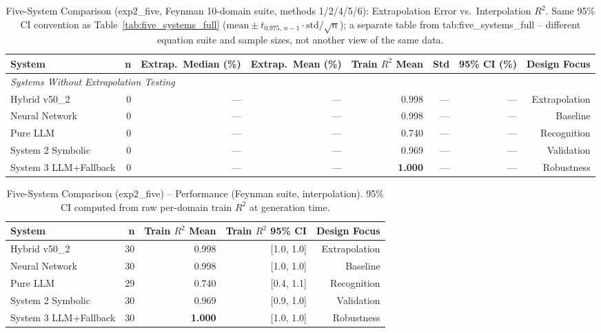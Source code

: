 \documentclass[twoside,11pt]{article}
\begin{document}
\begin{table}[t]
\centering
\caption{Five-System Comparison (exp2\_five, Feynman 10-domain suite,
  methods 1/2/4/5/6): Extrapolation Error vs.\ Interpolation $R^2$.
  Same 95\% CI convention as Table~\ref{tab:five_systems_full}
  ($\mathrm{mean} \pm t_{0.975,\,n-1} \cdot \mathrm{std}/\sqrt{n}$); a
  separate table from tab:five\_systems\_full -- different equation suite
  and sample sizes, not another view of the same data.}
\label{tab:five_systems_full_exp2five}
\begin{tabular}{lrrrrrrr}
\toprule
\textbf{System} & \textbf{n}
  & \textbf{Extrap.\ Median (\%)} & \textbf{Extrap.\ Mean (\%)}
  & \textbf{Train $R^2$ Mean} & \textbf{Std} & \textbf{95\% CI (\%)}
  & \textbf{Design Focus} \\
\midrule
\midrule
\multicolumn{8}{l}{\textit{Systems Without Extrapolation Testing}} \\
Hybrid v50\_2 & 0 & --- & --- & 0.998 & --- & --- & Extrapolation \\
Neural Network & 0 & --- & --- & 0.998 & --- & --- & Baseline \\
Pure LLM & 0 & --- & --- & 0.740 & --- & --- & Recognition \\
System 2 Symbolic & 0 & --- & --- & 0.969 & --- & --- & Validation \\
System 3 LLM+Fallback & 0 & --- & --- & \textbf{1.000} & --- & --- & Robustness \\
\bottomrule
\end{tabular}
\end{table}

\begin{table}[t]
\centering
\caption{Five-System Comparison (exp2\_five) -- Performance (Feynman suite,
  interpolation). 95\% CI computed from raw per-domain train $R^2$ at
  generation time.}
\label{tab:five_systems_performance_exp2five}
\begin{tabular}{lrrrr}
\toprule
\textbf{System} & \textbf{n} & \textbf{Train $R^2$ Mean}
  & \textbf{Train $R^2$ 95\% CI} & \textbf{Design Focus} \\
\midrule
Hybrid v50\_2 & 30 & 0.998 & [1.0, 1.0] & Extrapolation \\
Neural Network & 30 & 0.998 & [1.0, 1.0] & Baseline \\
Pure LLM & 29 & 0.740 & [0.4, 1.1] & Recognition \\
System 2 Symbolic & 30 & 0.969 & [0.9, 1.0] & Validation \\
System 3 LLM+Fallback & 30 & \textbf{1.000} & [1.0, 1.0] & Robustness \\
\bottomrule
\end{tabular}
\end{table}
\end{document}
